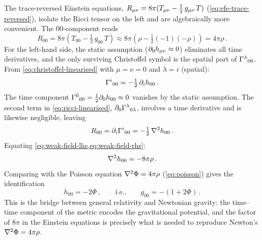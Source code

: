 The trace-reversed Einstein equations,
$R_{\mu\nu} = 8\pi(T_{\mu\nu} - \tfrac{1}{2}\,g_{\mu\nu}\,T)$
(\cref{eq:efe-trace-reversed}), isolate the Ricci tensor on the left
and are algebraically more convenient.  The $00$-component reads
%
\begin{equation}
  R_{00} = 8\pi\!\left(T_{00} - \tfrac{1}{2}\,g_{00}\,T\right)
         \approx 8\pi\!\left(\rho
           - \tfrac{1}{2}(-1)(-\rho)\right)
         = 4\pi\rho \,.
  \label{eq:weak-field-rhs}
\end{equation}
%
For the left-hand side, the static assumption
($\partial_{0} h_{\mu\nu} \approx 0$) eliminates all time derivatives,
and the only surviving Christoffel symbol is the spatial part of
$\Gamma^{\lambda}{}_{0 0}$.  From \cref{eq:christoffel-linearised}
with $\mu = \nu = 0$ and $\lambda = i$ (spatial):
%
\begin{equation}
  \Gamma^{i}{}_{0 0} = -\tfrac{1}{2}\,\partial_{i} h_{00} \,.
  \label{eq:gamma-i-00}
\end{equation}
%
The time component $\Gamma^{0}{}_{0 0} = \tfrac{1}{2}\partial_{0}h_{00}
\approx 0$ vanishes by the static assumption.  The second term in
\cref{eq:ricci-linearised}, $\partial_{0}\Gamma^{\lambda}{}_{0 \lambda}$,
involves a time derivative and is likewise negligible, leaving
%
\begin{equation}
  R_{00} = \partial_{i}\Gamma^{i}{}_{0 0}
         = -\tfrac{1}{2}\,\nabla^{2} h_{00} \,.
  \label{eq:weak-field-lhs}
\end{equation}
%
Equating \cref{eq:weak-field-lhs,eq:weak-field-rhs}:
%
\begin{equation}
  \nabla^{2} h_{00} = -8\pi\rho \,.
  \label{eq:h00-poisson}
\end{equation}
%
Comparing with the Poisson equation $\nabla^{2}\Phi = 4\pi\rho$
(\cref{eq:poisson}) gives the identification
%
\begin{equation}
  h_{00} = -2\Phi \,,
  \qquad\text{i.e.,}\qquad
  g_{00} = -(1 + 2\Phi) \,.
  \label{eq:g00-potential}
\end{equation}
%
This is the bridge between general relativity and Newtonian gravity: the
time--time component of the metric encodes the gravitational potential,
and the factor of $8\pi$ in the Einstein equations is precisely what is
needed to reproduce Newton's $\nabla^{2}\Phi = 4\pi\rho$.

